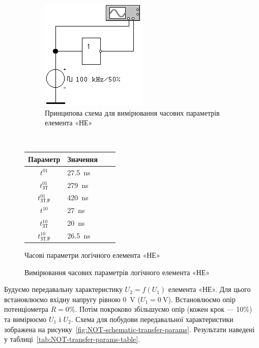 \documentclass[a4paper,oneside,DIV=10,12pt]{scrartcl}
\begin{document}
			\begin{figure}
			\centering
				\begin{subfigure}[b]{0.5\textwidth}
				\centering
					\includegraphics[]{schematics/01-01-not.png}
				\caption{Принципова схема для вимірювання часових параметрів елемента «НЕ»}
				\label{fig:NOT-schematic}
				\end{subfigure}
				~
				\begin{subtable}[b]{0.4\textwidth}
				\centering
					\begin{tabular}{ClCr}
						\toprule
							Параметр & Значення \\
						\midrule
							$t^{01}$                & \SI{27,5}{\nano\second}\\
							$t^{01}_{\text{ЗТ}}$    & \SI{ 279}{\nano\second}\\
							$t^{01}_{\text{ЗТ.Р}}$  & \SI{ 420}{\nano\second}\\
							$t^{10}$                & \SI{  27}{\nano\second}\\
							$t^{10}_{\text{ЗТ}}$    & \SI{  20}{\nano\second}\\
							$t^{10}_{\text{ЗТ.Р}}$  & \SI{26,5}{\nano\second}\\
						\bottomrule
					\end{tabular}
				\caption{Часові параметри логічного елемента «НЕ»}
				\label{tab:NOT-time-params}
				\end{subtable}
			\caption{Вимірювання часових параметрів логічного елемента «НЕ»}
			\end{figure}
			
			Будуємо передавальну характеристику $U_2 = f(U_1)$ елемента «НЕ». Для цього встановлюємо вхідну напругу рівною \SI{0}{\volt} ($U_1 = \SI{0}{\volt}$). Встановлюємо опір потенціометра $R = 0\%$. Потім покроково збільшуємо опір (кожен крок — 10\%) та вимірюємо $U_1$ і $U_2$. Схема для побудови передавальної характеристики зображена на рисунку~\ref{fig:NOT-schematic-transfer-params}. Результати наведені у таблиці~\ref{tab:NOT-transfer-params-table}.
			
\end{document}
